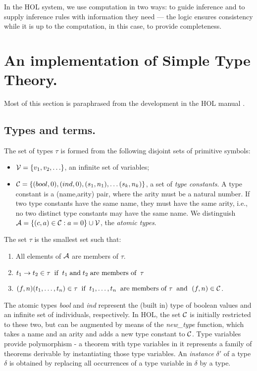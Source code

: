 In the HOL system, we use computation in two ways: to guide inference and to
supply inference rules with information they need --- the logic ensures
consistency while it is up to the computation, in this case, to provide
completeness.

\section{An implementation of Simple Type Theory.}

Most of this section is paraphrased from the development in the HOL manual \cite{gordon89}.

\subsection{Types and terms.}

The set of types $\tau$ is formed from the following disjoint sets of
primitive symbols:
\begin{itemize}
\item  ${\cal V} = \{v_1, v_2, \ldots \}$, an infinite set of variables;
\item  ${\cal C} = \{(bool,0), (ind,0), (s_1,n_1), \ldots (s_k,n_k) \}$, a set
of {\it type constants}. A type constant is a (name,arity) pair, where the arity must be a
natural number. If two type constants have the same name, they must have the same
arity, i.e., no two distinct type constants may have the same name. We distinguish
${\cal A} = \{(c,a) \in {\cal C} : a = 0\} \cup {\cal V}$, the {\em atomic types}.
\end{itemize}

The set $\tau$ is the smallest set such that:
\begin{enumerate}
\item All elements of ${\cal A}$ are members of $\tau$.
\item $t_1 \rightarrow t_2 \in \tau \;\; \mbox{\rm if} \;\; t_1 \; \mbox{\rm
and} \; t_2 \;\mbox{\rm are members of}\;\; \tau$
\item $(f,n)(t_1, \ldots, t_n) \in \tau \;\;\mbox{\rm if} \;\; t_1, \ldots, t_n
\;\;\mbox{\rm are members of } \tau \;\; \mbox{\rm and } \; (f,n) \in {\cal C}$. 
\end{enumerate}

The atomic types {\em bool} and {\em ind} represent the (built in) type of
boolean values and an infinite set of individuals, respectively. In HOL, the
set ${\cal C}$ is initially restricted to these two, but can be augmented by
means of the {\em new\_type} function, which takes a name and an arity and adds
a new type constant to ${\cal C}$. Type variables provide polymorphism - a
theorem with type variables in it represents a family of theorems derivable by
instantiating those type variables. An {\em instance} $\delta'$ of a type
$\delta$ is obtained by replacing all occurrences of a type variable in
$\delta$ by a type. 

